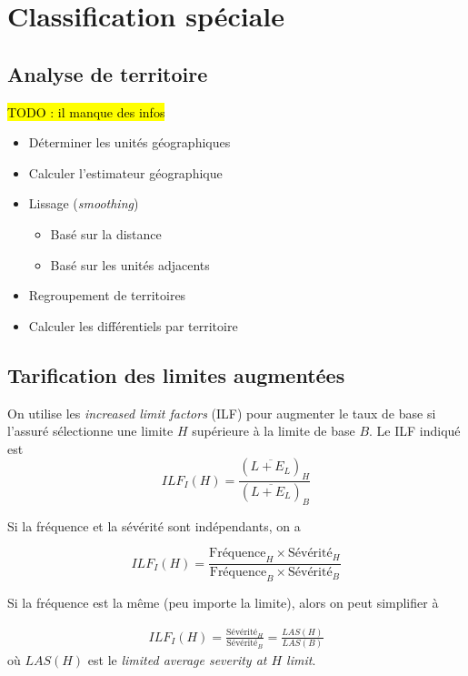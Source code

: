 \section{Classification spéciale}
\subsection{Analyse de territoire}
\hl{TODO : il manque des infos}

\begin{itemize}
\item Déterminer les unités géographiques
\item Calculer l'estimateur géographique
\item Lissage (\textit{smoothing})
\begin{itemize}
	\item Basé sur la distance
	\item Basé sur les unités adjacents
\end{itemize}
\item Regroupement de territoires
\item Calculer les différentiels par territoire
\end{itemize}

\subsection{Tarification des limites augmentées} On utilise les \textit{increased limit factors} (ILF) pour augmenter le taux de base si l'assuré sélectionne une limite $H$ supérieure à la limite de base $B$. Le ILF indiqué est
\begin{equation}
ILF_I(H) = \frac{(\overline{L+E_L})_H}{(\overline{L+E_L})_B}
\end{equation}

Si la fréquence et la sévérité sont indépendants, on a

\begin{equation}
ILF_I(H) =\frac{\text{Fréquence}_H \times \text{Sévérité}_H}{\text{Fréquence}_B \times \text{Sévérité}_B}
\end{equation}

Si la fréquence est la même (peu importe la limite), alors on peut simplifier à 

\begin{align*}
ILF_I(H) =\frac{\text{Sévérité}_H}{\text{Sévérité}_B} = \frac{LAS(H)}{LAS(B)}
\end{align*}
où $LAS(H)$ est le \textit{limited average severity at $H$ limit}.


